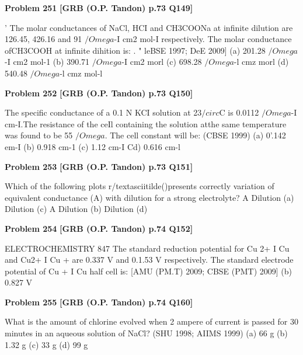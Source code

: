 \begin{problembox}
\textbf{Problem 251} \hfill \textbf{[GRB (O.P. Tandon) p.73 Q149]}
\label{q:ext-grb_all_questions-251}

' The molar conductances of NaCl, HCI and CH3COONa at 
infinite dilution are 126.45, 426.16 and 91 $/Omega$-I cm2 mol-I 
respectively. The molar conductance ofCH3COOH at infinite 
dihition is: . 
" 
leBSE 1997; DeE 2009] 
(a) 201.28 $/Omega$-I cm2 mol-1 (b) 390.71 $/Omega$-I cm2 morl 
(c) 698.28 $/Omega$-l cmz morl (d) 540.48 $/Omega$-l cmz mol-l
\end{problembox}

\begin{problembox}
\textbf{Problem 252} \hfill \textbf{[GRB (O.P. Tandon) p.73 Q150]}
\label{q:ext-grb_all_questions-252}

The specific conductance of a 0.1 N KCI solution at 23$/circ$C is 
0.0112 $/Omega$-I cm-I.The resistance of the ceIl containing the 
solution atthe same temperature was found to be 55 $/Omega$. The 
cell constant will be: 
(CBSE 1999) 
(a) 0'.142 em-I 
(b) 0.918 cm-1 
(c) 1.12 cm-I 
Cd) 0.616 cm-l
\end{problembox}

\begin{problembox}
\textbf{Problem 253} \hfill \textbf{[GRB (O.P. Tandon) p.73 Q151]}
\label{q:ext-grb_all_questions-253}

Which of the following plots r/textasciitilde()presents correctly variation of 
equivalent conductance (A) with dilution for a strong 
electrolyte? 
A 
Dilution 
(a) 
Dilution 
(c) 
A 
Dilution 
(b) 
Dilution 
(d)
\end{problembox}

\begin{problembox}
\textbf{Problem 254} \hfill \textbf{[GRB (O.P. Tandon) p.74 Q152]}
\label{q:ext-grb_all_questions-254}

ELECTROCHEMISTRY 
847 
The standard reduction potential for Cu 2+ I Cu and 
Cu2+ I Cu + are 0.337 V and 0.1.53 V respectively. The 
standard electrode potential of Cu + I Cu half cell is: 
[AMU (PM.T) 2009; CBSE (PMT) 2009] 
(b) 0.827 V
\end{problembox}

\begin{problembox}
\textbf{Problem 255} \hfill \textbf{[GRB (O.P. Tandon) p.74 Q160]}
\label{q:ext-grb_all_questions-255}

What is the amount of chlorine evolved when 2 ampere of 
current is passed for 30 minutes in an aqueous solution of 
NaCl? 
(SHU 1998; AIIMS 1999) 
(a) 66 g 
(b) 1.32 g 
(c) 33 g 
(d) 99 g
\end{problembox}

